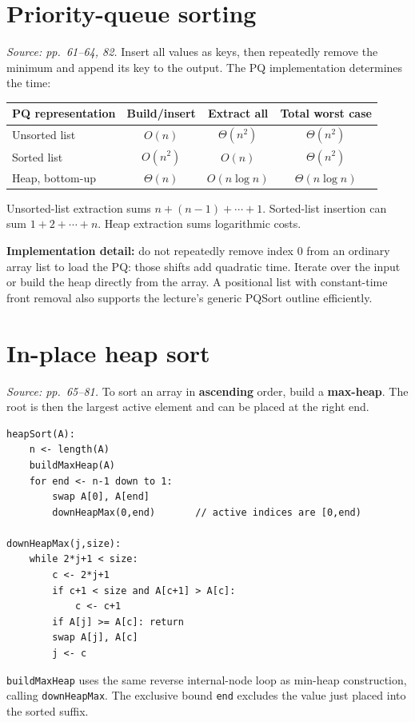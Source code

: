 \documentclass[11pt]{article}
\begin{document}
\section{Priority-queue sorting}
\textit{Source: pp.\ 61--64, 82.}
Insert all values as keys, then repeatedly remove the minimum and append its key to the output. The PQ implementation determines the time:
\begin{center}
\begin{tabular}{lccc}
\toprule
PQ representation & Build/insert & Extract all & Total worst case\\
\midrule
Unsorted list & $O(n)$ & $\Theta(n^2)$ & $\Theta(n^2)$\\
Sorted list & $O(n^2)$ & $O(n)$ & $\Theta(n^2)$\\
Heap, bottom-up & $\Theta(n)$ & $O(n\log n)$ & $\Theta(n\log n)$\\
\bottomrule
\end{tabular}
\end{center}
Unsorted-list extraction sums $n+(n-1)+\cdots+1$. Sorted-list insertion can sum $1+2+\cdots+n$. Heap extraction sums logarithmic costs.

\textbf{Implementation detail:} do not repeatedly remove index $0$ from an ordinary array list to load the PQ: those shifts add quadratic time. Iterate over the input or build the heap directly from the array. A positional list with constant-time front removal also supports the lecture's generic PQSort outline efficiently.

\section{In-place heap sort}
\textit{Source: pp.\ 65--81.}
To sort an array in \textbf{ascending} order, build a \textbf{max-heap}. The root is then the largest active element and can be placed at the right end.
\begin{lstlisting}
heapSort(A):
    n <- length(A)
    buildMaxHeap(A)
    for end <- n-1 down to 1:
        swap A[0], A[end]
        downHeapMax(0,end)       // active indices are [0,end)

downHeapMax(j,size):
    while 2*j+1 < size:
        c <- 2*j+1
        if c+1 < size and A[c+1] > A[c]:
            c <- c+1
        if A[j] >= A[c]: return
        swap A[j], A[c]
        j <- c
\end{lstlisting}
\texttt{buildMaxHeap} uses the same reverse internal-node loop as min-heap construction, calling \texttt{downHeapMax}. The exclusive bound \texttt{end} excludes the value just placed into the sorted suffix.
\end{document}
